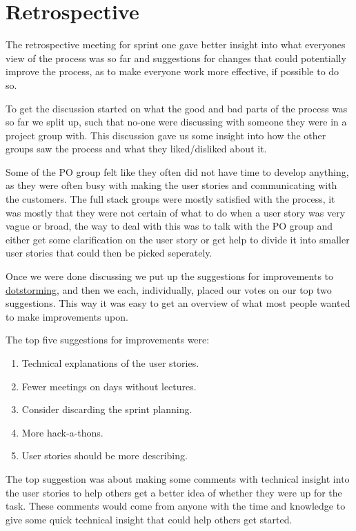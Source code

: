 \section{Retrospective}
The retrospective meeting for sprint one gave better insight into what everyones view of the process was so far and suggestions for changes that could potentially improve the process, as to make everyone work more effective, if possible to do so. 

To get the discussion started on what the good and bad parts of the process was so far we split up, such that no-one were discussing with someone they were in a project group with. 
This discussion gave us some insight into how the other groups saw the process and what they liked/disliked about it. 

Some of the PO group felt like they often did not have time to develop anything, as they were often busy with making the user stories and communicating with the customers. 
The full stack groups were mostly satisfied with the process, it was mostly that they were not certain of what to do when a user story was very vague or broad, the way to deal with this was to talk with the PO group and either get some clarification on the user story or get help to divide it into smaller user stories that could then be picked seperately.

Once we were done discussing we put up the suggestions for improvements to \href{www.dotstorming.com}{dotstorming}, and then we each, individually, placed our votes on our top two suggestions.
This way it was easy to get an overview of what most people wanted to make improvements upon.

The top five suggestions for improvements were:
\begin{enumerate}
  \item Technical explanations of the user stories.
  \item Fewer meetings on days without lectures.
  \item Consider discarding the sprint planning.
  \item More hack-a-thons.
  \item User stories should be more describing.
\end{enumerate}

The top suggestion was about making some comments with technical insight into the user stories to help others get a better idea of whether they were up for the task.
These comments would come from anyone with the time and knowledge to give some quick technical insight that could help others get started. 

